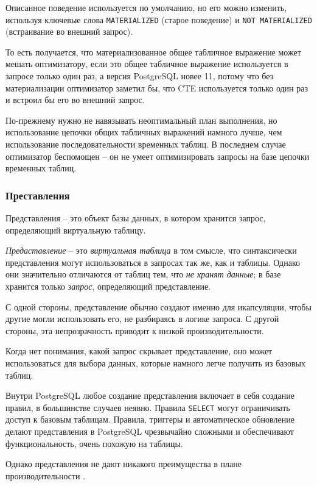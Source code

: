 \documentclass[%
	11pt,
	a4paper,
	utf8,
		]{article}
\begin{document}
Описанное поведение используется по умолчанию, но его можно изменить, используя ключевые слова \verb|MATERIALIZED| (старое поведение) и \verb|NOT MATERIALIZED| (встраивание во внешний запрос).

То есть получается, что материализованное общее табличное выражение может мешать оптимизатору, если это общее табличное выражение используется в запросе только один раз, а версия PostgreSQL новее 11, потому что без материализации оптимизатор заметил бы, что CTE используется только один раз и встроил бы его во внешний запрос.

По-прежнему нужно не навязывать неоптимальный план выполнения, но использование цепочки общих табличных выражений намного лучше, чем использование последовательности временных таблиц. В последнем случае оптимизатор беспомощен -- он не умеет оптимизировать запросы на базе цепочки временных таблиц.

\subsubsection{Преставления}

Представления -- это объект базы данных, в котором хранится запрос, определяющий виртуальную таблицу.

\emph{Предаставление} -- это \emph{виртуальная таблица} в том смысле, что синтаксически представления могут использоваться в запросах так же, как и таблицы. Однако они значительно отличаются от таблиц тем, что \emph{не хранят данные}; в базе хранится только \emph{запрос}, определяющий представление.

С одной стороны, представление обычно создают именно для икапсуляции, чтобы другие могли использовать его, не разбираясь в логике запроса. С другой стороны, эта непрозрачность приводит к низкой производительности.

Когда нет понимания, какой запрос скрывает представление, оно может использоваться для выбора данных, которые намного легче получить из базовых таблиц.

Внутри PostgreSQL любое создание представления включает в себя создание правил, в большинстве случаев неявно. Правила \verb|SELECT| могут ограничивать доступ к базовым таблицам. Правила, триггеры и автоматическое обновление делают представления в PostgreSQL чрезвычайно сложными и обеспечивают функциональность, очень похожую на таблицы.

Однако представления не дают никакого преимущества в плане производительности \cite[]{dombrovskaya:postgresql-2022}.
\end{document}

